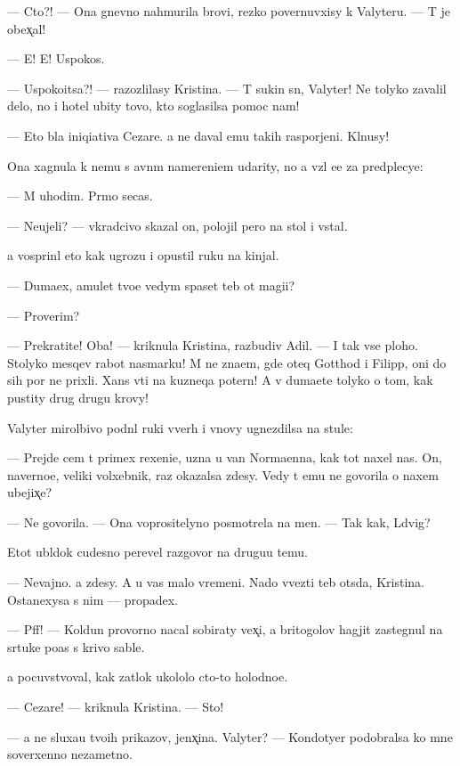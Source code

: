 \documentclass[10pt]{book}
\begin{document}
— Cto?! — Ona gnevno nahmurila brovi, rezko povernuvxisy k Valyteru. — T{\yi} je obex̨al!

— E{\y}! E{\y}! Uspoko{\y}s{\ia}.

— Uspoko{\y}itsa?! — razozlilasy Kristina. — T{\yi} sukin s{\yi}n, Valyter! Ne tolyko zavalil delo, no i hotel ubity tovo, kto soglasilsa pomoc nam!

— Eto b{\yi}la iniqiativa Cezare. {\Y}a ne daval {\y}emu takih raspor{\ia}jeni{\y}. Kl{\ia}nusy!

Ona xagnula k nemu s {\y}avn{\yi}m namereni{\y}em udarity, no {\y}a vz{\ia}l {\y}e{\y}e za predplecye:

— M{\yi} uhodim. Pr{\ia}mo se{\y}cas.

— Neujeli? — vkradcivo skazal on, polojil pero na stol i vstal.

{\Y}a vosprin{\ia}l eto kak ugrozu i opustil ruku na kinjal.

— Duma{\y}ex, amulet tvo{\y}e{\y} vedym{\yi} spaset teb{\ia} ot magi{\y}i?

— Proverim?

— Prekratite! Oba! — kriknula Kristina, razbudiv Adil{\ia}. — I tak vse ploho. Stolyko mes{\ia}qev rabot{\yi} nasmarku! M{\yi} ne zna{\y}em, gde oteq Gotthod i Filipp, oni do sih por ne prixli. Xans v{\yi}{\y}ti na kuzneqa poter{\ia}n! A v{\yi} duma{\y}ete tolyko o tom, kak pustity drug drugu krovy!

Valyter mirol{\iu}bivo podn{\ia}l ruki vverh i vnovy ugnezdilsa na stule:

— Prejde cem t{\yi} primex rexeni{\y}e, uzna{\y} u van Norma{\y}enna, kak tot naxel nas. On, naverno{\y}e, veliki{\y} volxebnik, raz okazalsa zdesy. Vedy t{\yi} {\y}emu ne govorila o naxem ubejix̨e?

— Ne govorila. — Ona voprositelyno posmotrela na men{\ia}. — Tak kak, L{\iu}dvig?

Etot ubl{\iu}dok cudesno perevel razgovor na drugu{\y}u temu.

— Nevajno. {\Y}a zdesy. A u vas malo vremeni. Nado v{\yi}vezti teb{\ia} ots{\iu}da, Kristina. Ostanexysa s nim — propadex.

— Pff! — Koldun provorno nacal sobiraty vex̨i, a britogolov{\yi}{\y} hagjit zastegnul na s{\iu}rtuke po{\y}as s krivo{\y} sable{\y}.

{\Y}a pocuvstvoval, kak zat{\yi}lok ukololo cto-to holodno{\y}e.

— Cezare! — kriknula Kristina. — Sto{\y}!

— {\Y}a ne sluxa{\y}u tvo{\y}ih prikazov, jenx̨ina. Valyter? — Kondotyer podobralsa ko mne soverxenno nezametno.
\end{document}
